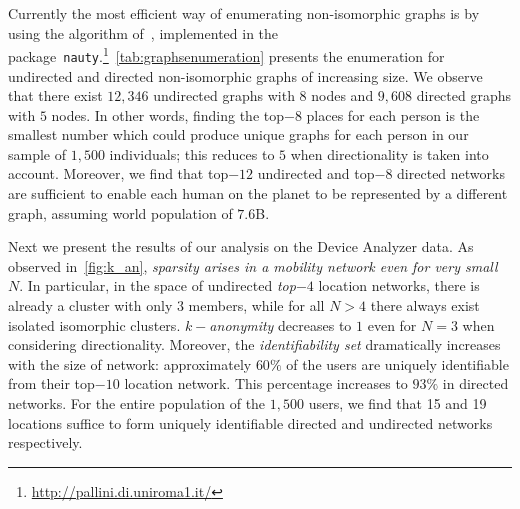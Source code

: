\begin{table*}[!t]
	\centering
	\caption{Sequences of non-isomorphic graphs for undirected and directed graphs of increasing size.}
	\label{tab:graphsenumeration}
\end{table*}

Currently the most efficient way of enumerating  non-isomorphic graphs is by using the algorithm of~, implemented in the package~\texttt{nauty}.\footnote{\url{http://pallini.di.uniroma1.it/}}~\cref{tab:graphsenumeration} presents the enumeration for undirected and directed non-isomorphic graphs of increasing size. We observe that there exist $12,346$ undirected graphs with $8$ nodes and $9,608$ directed graphs with $5$ nodes. In other words, finding the top$-8$ places for each person is the smallest number which could produce unique graphs for each person in our sample of $1,500$ individuals; this reduces to $5$ when directionality is taken into account. Moreover, we find that top$-12$ undirected and top$-8$ directed networks are sufficient to enable each human on the planet to be represented by a different graph, assuming world population of $7.6$B.

Next we present the results of our analysis on the Device Analyzer data.
As observed in~\cref{fig:k_an}, \emph{sparsity arises in a mobility network even for very small $ N $}.
In particular, in the space of undirected \emph{top$-4$} location networks, there is already a cluster with only $ 3 $ members, while for all $ N > 4 $ there always exist isolated isomorphic clusters.
\emph{$ k-$anonymity} decreases to $ 1 $ even for $ N=3 $ when considering directionality.
Moreover, the \emph{identifiability set} dramatically increases with the size of network: approximately $ 60\% $ of the users are uniquely identifiable from their top$-10$ location network.
This percentage increases to $93\%$ in directed networks.
For the entire population of the $ 1,500 $ users, we find that 15 and 19 locations suffice to form uniquely identifiable directed and undirected networks respectively.

